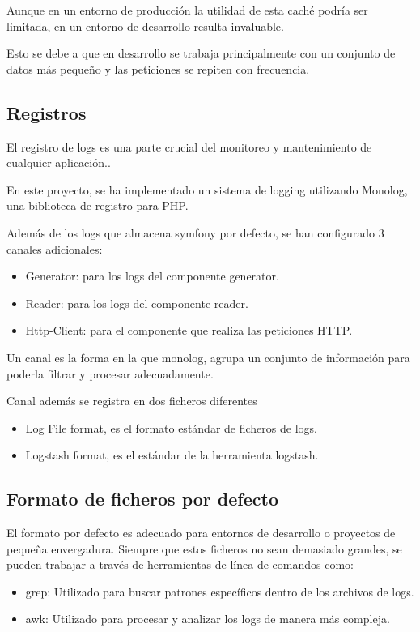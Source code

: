 Aunque en un entorno de producción la utilidad de esta caché podría ser limitada, en un entorno de desarrollo resulta
invaluable.

Esto se debe a que en desarrollo se trabaja principalmente con un conjunto de datos más pequeño y las peticiones se
repiten con frecuencia.

\subsection*{Registros}

El registro de logs es una parte crucial del monitoreo y mantenimiento de cualquier aplicación..

En este proyecto, se ha implementado un sistema de logging utilizando Monolog, una biblioteca de registro para PHP.

Además de los logs que almacena symfony por defecto, se han configurado 3 canales adicionales:

\begin{itemize}
    \item Generator: para los logs del componente generator.
    \item Reader: para los logs del componente reader.
    \item Http-Client: para el componente que realiza las peticiones HTTP.
\end{itemize}

Un canal es la forma en la que monolog, agrupa un conjunto de información para poderla filtrar y procesar adecuadamente.

Canal además se registra en dos ficheros diferentes

\begin{itemize}
    \item Log File format, es el formato estándar de ficheros de logs.
    \item Logstash format, es el estándar de la herramienta logstash.
\end{itemize}

\subsection*{Formato de ficheros por defecto}
El formato por defecto es adecuado para entornos de desarrollo o proyectos de pequeña envergadura. Siempre que estos
ficheros no sean demasiado grandes, se pueden trabajar a través de herramientas de línea de comandos como:

\begin{itemize}
    \item grep: Utilizado para buscar patrones específicos dentro de los archivos de logs.
    \item awk: Utilizado para procesar y analizar los logs de manera más compleja.
\end{itemize}

